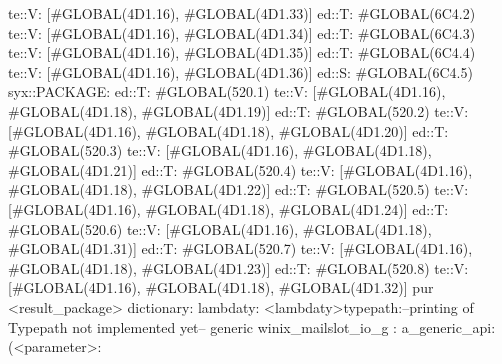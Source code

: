                      te::V:
                     [#GLOBAL(4D1.16), #GLOBAL(4D1.33)]
                    ed::T: #GLOBAL(6C4.2)
                     te::V:
                     [#GLOBAL(4D1.16), #GLOBAL(4D1.34)]
                    ed::T: #GLOBAL(6C4.3)
                     te::V:
                     [#GLOBAL(4D1.16), #GLOBAL(4D1.35)]
                    ed::T: #GLOBAL(6C4.4)
                     te::V:
                     [#GLOBAL(4D1.16), #GLOBAL(4D1.36)]
                    ed::S: #GLOBAL(6C4.5)
                     syx::PACKAGE:
                        ed::T: #GLOBAL(520.1)
                         te::V:
                         [#GLOBAL(4D1.16), #GLOBAL(4D1.18), #GLOBAL(4D1.19)]
                        ed::T: #GLOBAL(520.2)
                         te::V:
                         [#GLOBAL(4D1.16), #GLOBAL(4D1.18), #GLOBAL(4D1.20)]
                        ed::T: #GLOBAL(520.3)
                         te::V:
                         [#GLOBAL(4D1.16), #GLOBAL(4D1.18), #GLOBAL(4D1.21)]
                        ed::T: #GLOBAL(520.4)
                         te::V:
                         [#GLOBAL(4D1.16), #GLOBAL(4D1.18), #GLOBAL(4D1.22)]
                        ed::T: #GLOBAL(520.5)
                         te::V:
                         [#GLOBAL(4D1.16), #GLOBAL(4D1.18), #GLOBAL(4D1.24)]
                        ed::T: #GLOBAL(520.6)
                         te::V:
                         [#GLOBAL(4D1.16), #GLOBAL(4D1.18), #GLOBAL(4D1.31)]
                        ed::T: #GLOBAL(520.7)
                         te::V:
                         [#GLOBAL(4D1.16), #GLOBAL(4D1.18), #GLOBAL(4D1.23)]
                        ed::T: #GLOBAL(520.8)
                         te::V:
                         [#GLOBAL(4D1.16), #GLOBAL(4D1.18), #GLOBAL(4D1.32)]
                     pur
         <result_package>
dictionary:
lambdaty:
  <lambdaty>typepath:--printing of Typepath not implemented yet--
generic winix_mailslot_io_g
:
a_generic_api:
(<parameter>:
